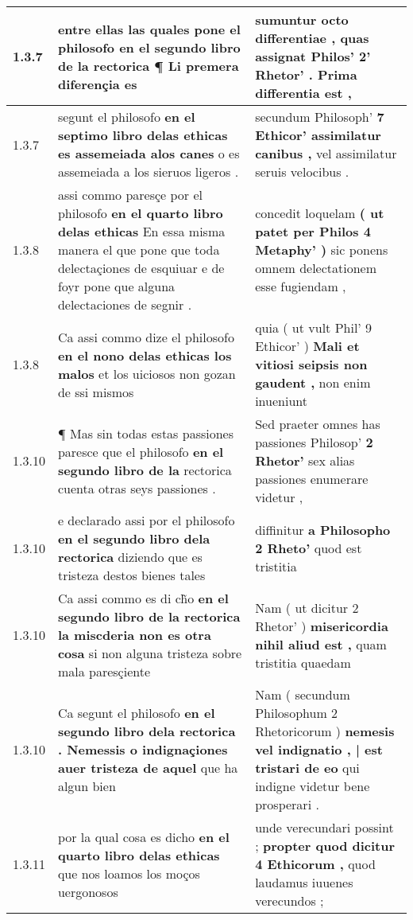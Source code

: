 \begin{tabular}{|p{1cm}|p{6.5cm}|p{6.5cm}|}
1.3.7 & entre ellas las quales pone el philosofo \textbf{ en el segundo libro de la rectorica ¶ } Li premera diferençia es & sumuntur octo differentiae , \textbf{ quas assignat Philos’ 2’ Rhetor’ . } Prima differentia est , \\\hline
1.3.7 & segunt el philosofo \textbf{ en el septimo libro delas ethicas es assemeiada alos canes } o es assemeiada a los sieruos ligeros . & secundum Philosoph’ \textbf{ 7 Ethicor’ assimilatur canibus , } vel assimilatur seruis velocibus . \\\hline
1.3.8 & assi commo paresçe por el philosofo \textbf{ en el quarto libro delas ethicas } En essa misma manera el que pone que toda delectaçiones de esquiuar e de foyr pone que alguna delectaciones de segnir . & concedit loquelam \textbf{ ( ut patet per Philos 4 Metaphy’ ) } sic ponens omnem delectationem esse fugiendam , \\\hline
1.3.8 & Ca assi commo dize el philosofo \textbf{ en el nono delas ethicas los malos } et los uiciosos non gozan de ssi mismos & quia ( ut vult Phil’ 9 Ethicor’ ) \textbf{ Mali et vitiosi seipsis non gaudent , } non enim inueniunt \\\hline
1.3.10 & ¶ Mas sin todas estas passiones paresce que el philosofo \textbf{ en el segundo libro de la } rectorica cuenta otras seys passiones . & Sed praeter omnes has passiones Philosop’ \textbf{ 2 Rhetor’ } sex alias passiones enumerare videtur , \\\hline
1.3.10 & e declarado assi por el philosofo \textbf{ en el segundo libro dela rectorica } diziendo que es tristeza destos bienes tales & diffinitur \textbf{ a Philosopho 2 Rheto’ } quod est tristitia \\\hline
1.3.10 & Ca assi commo es di ch̃o \textbf{ en el segundo libro de la rectorica la miscderia non es otra cosa } si non alguna tristeza sobre mala paresçiente & Nam ( ut dicitur 2 Rhetor’ ) \textbf{ misericordia nihil aliud est , } quam tristitia quaedam \\\hline
1.3.10 & Ca segunt el philosofo \textbf{ en el segundo libro dela rectorica . Nemessis o indignaçiones auer tristeza de aquel } que ha algun bien & Nam ( secundum Philosophum 2 Rhetoricorum ) \textbf{ nemesis vel indignatio , | est tristari de eo } qui indigne videtur bene prosperari . \\\hline
1.3.11 & por la qual cosa es dicho \textbf{ en el quarto libro delas ethicas } que nos loamos los moços uergonosos & unde verecundari possint ; \textbf{ propter quod dicitur 4 Ethicorum , } quod laudamus iuuenes verecundos ; \\\hline

\end{tabular}
